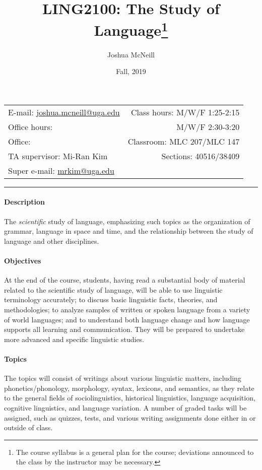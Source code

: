 \documentclass{article}
\title{LING2100: The Study of Language\footnote{The course syllabus is a general plan for the course; deviations announced to the class by the instructor may be necessary.}}
\author{Joshua McNeill}
\date{Fall, 2019}
\begin{document}
  \maketitle

  \begin{center}
    \begin{tabular}{@{} l r @{}}
      E-mail: \url{joshua.mcneill@uga.edu}              & Class hours: M/W/F 1:25-2:15\\
      Office hours:   & M/W/F 2:30-3:20\\
      Office:      & Classroom: MLC 207/MLC 147\\
      TA supervisor: Mi-Ran Kim                         & Sections: 40516/38409\\
      Super e-mail: \url{mrkim@uga.edu}
    \end{tabular}
  \end{center}

  \hrule

  \paragraph{Description}
    The \emph{scientific} study of language, emphasizing such topics as the organization of grammar, language in space and time, and the relationship between the study of language and other disciplines.

  \paragraph{Objectives}
    At the end of the course, students, having read a substantial body of material related to the scientific study of language, will be able to use linguistic terminology accurately; to discuss basic linguistic facts, theories, and methodologies; to analyze samples of written or spoken language from a variety of world languages; and to understand both language change and how language supports all learning and communication. They will be prepared to undertake more advanced and specific linguistic studies.

  \paragraph{Topics}
    The topics will consist of writings about various linguistic matters, including phonetics/phonology, morphology, syntax, lexicons, and semantics, as they relate to the general fields of sociolinguistics, historical linguistics, language acquisition, cognitive linguistics, and language variation. A number of graded tasks will be assigned, such as quizzes, tests, and various writing assignments done either in or outside of class.
\end{document}
